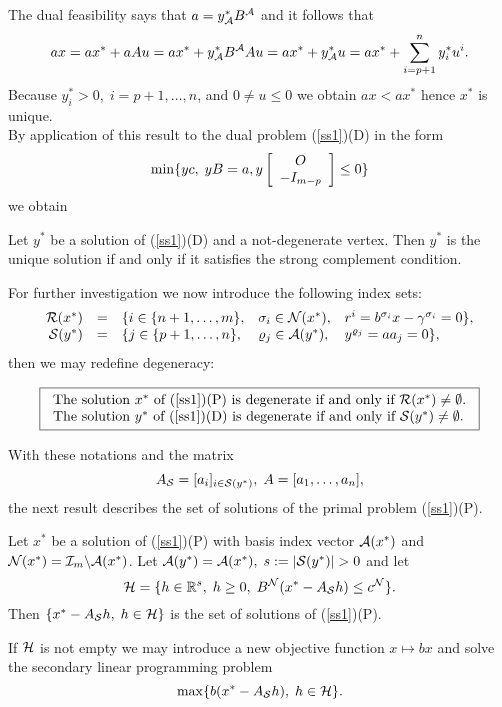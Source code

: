The dual feasibility says that $a = y^*_{\A}B^{\A}$ and it follows that
\[
ax = ax^* + aAu = ax^* + y^*_{\A}B^{\A}Au
= ax^* + y^*_{\A}u = ax^* + \sum_{i=p+1}^ny^*_iu^i.
\]
Because $y^*_i > 0, \; i = p+1, \ldots, n$, and $0 \neq u \leq 0$ we obtain $ax
< ax^*$ hence $x^*$ is unique.\\
%
%
By application of this result to the dual problem (\ref{ss1})(D) in the form
\begin{equation} \label{ss3c}
\min \{yc, \; yB = a,  y\ba{[}{c}  O  \\-I_{m-p}\ea{]} \leq 0\}
\end{equation}
we obtain
%
\begin{theorem} \label{ss5}
Let $y^*$ be a solution of (\ref{ss1})(D) and a not-degenerate vertex. Then
$y^*$ is the unique solution if and only if it satisfies  the strong
complement condition.
\end{theorem}
%
For further investigation we now introduce the following index sets:
\[
\ba{.}{rclll}
\R(x^*) &=& \{i \in \{n+1, \ldots, m \}, &\sigma _i  \in \N(x^*), &r^i =
b^{\sigma _i}x - \gamma ^{\sigma _i} = 0\},\\
{\cal S} (y^*) &=& \{j \in \{ p+1, \ldots, n \}, &\rho _j  \in \A(y^*),
&y^{\rho _j} = aa_j = 0\},
\ea{.}
\]
then we may redefine degeneracy:
\par
\[
\fbox{$
\ba{.}{l}
\mbox{The solution $x^*$ of (\ref{ss1})(P) is degenerate if and only if
$\R(x^*) \neq \emptyset$}.\\
\mbox{The solution $y^*$ of (\ref{ss1})(D) is degenerate if and only if ${\cal
S} (y^*) \neq \emptyset$}.
\ea{.}
$}
\]
\par
%
With these notations and the matrix
\[
A_{{\cal S} } = [a_i]_{i\in {\cal S} (y^*)}, \; A = [a_1, \ldots, a_n],
\]
the next result describes the set of solutions of the primal problem
(\ref{ss1})(P).
%
\begin{theorem} \label{ss7} Let $x^*$ be a solution of (\ref{ss1})(P) with
basis index vector $\A(x^*)$ and $\N(x^*) = \I_m \backslash
\A(x^*)$. Let $\A(y^*) = \A(x^*), \; s := |{\cal S} (y^*)| > 0$ and let
\[
{\cal H} = \{h \in \Bbb{R}^s, \; h \geq 0, \; B^{\N}(x^* - A_{{\cal S} }h)
\leq c^{\N}\}.
\]
Then $\{x^* - A_{{\cal S} }h, \; h \in {\cal H}\}$ is the set of solutions
of (\ref{ss1})(P).
\end{theorem}
%
If ${\cal H}$ is not empty we may introduce a new objective function $x
\mapsto bx$ and solve the secondary linear programming problem
\[
\max\{b(x^*- A_{{\cal S} }h), \; h \in {\cal H}\}.
\]
